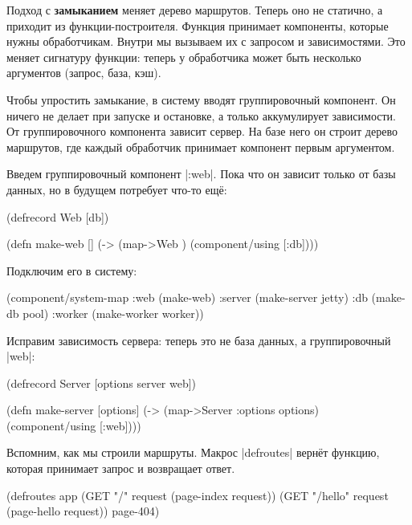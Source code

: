 Подход с \textbf{замыканием} меняет дерево маршрутов. Теперь оно не статично, а
приходит из функции-построителя. Функция принимает компоненты, которые нужны
обработчикам. Внутри мы вызываем их с запросом и зависимостями. Это меняет
сигнатуру функции: теперь у обработчика может быть несколько аргументов (запрос,
база, кэш).

Чтобы упростить замыкание, в систему вводят группировочный компонент. Он ничего
не делает при запуске и остановке, а только аккумулирует зависимости. От
группировочного компонента зависит сервер. На базе него он строит дерево
маршрутов, где каждый обработчик принимает компонент первым аргументом.

Введем группировочный компонент \spverb|:web|. Пока что он зависит только от
базы данных, но в будущем потребует что-то ещ\"{е}:

\begin{english}
  \begin{clojure}
(defrecord Web [db])

(defn make-web []
  (-> (map->Web {})
      (component/using [:db])))
  \end{clojure}
\end{english}

\noindent
Подключим его в систему:

\begin{english}
  \begin{clojure}
(component/system-map
 :web    (make-web)
 :server (make-server jetty)
 :db     (make-db pool)
 :worker (make-worker worker))
  \end{clojure}
\end{english}

Исправим зависимость сервера: теперь это не база данных, а группировочный
\spverb|web|:

\begin{english}
  \begin{clojure}
(defrecord Server
  [options server web])

(defn make-server
  [options]
  (-> (map->Server {:options options})
      (component/using [:web])))
  \end{clojure}
\end{english}

Вспомним, как мы строили маршруты. Макрос \spverb|defroutes| верн\"{е}т функцию,
которая принимает запрос и возвращает ответ.

\begin{english}
  \begin{clojure}
(defroutes app
  (GET "/"      request (page-index request))
  (GET "/hello" request (page-hello request))
  page-404)
  \end{clojure}
\end{english}

